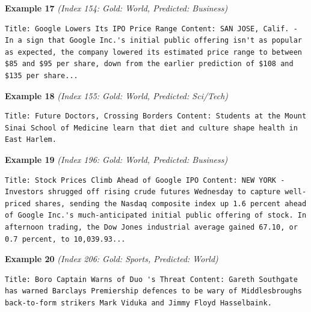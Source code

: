 \noindent
\textbf{Example 17} \quad \textit{(Index 154: Gold: World, Predicted: Business)}

\begin{Verbatim}[breaklines=true,breakanywhere=true,fontsize=\small]
Title: Google Lowers Its IPO Price Range Content: SAN JOSE, Calif. - In a sign that Google Inc.'s initial public offering isn't as popular as expected, the company lowered its estimated price range to between $85 and $95 per share, down from the earlier prediction of $108 and $135 per share...
\end{Verbatim}

\noindent
\textbf{Example 18} \quad \textit{(Index 155: Gold: World, Predicted: Sci/Tech)}

\begin{Verbatim}[breaklines=true,breakanywhere=true,fontsize=\small]
Title: Future Doctors, Crossing Borders Content: Students at the Mount Sinai School of Medicine learn that diet and culture shape health in East Harlem.
\end{Verbatim}

\noindent
\textbf{Example 19} \quad \textit{(Index 196: Gold: World, Predicted: Business)}

\begin{Verbatim}[breaklines=true,breakanywhere=true,fontsize=\small]
Title: Stock Prices Climb Ahead of Google IPO Content: NEW YORK - Investors shrugged off rising crude futures Wednesday to capture well-priced shares, sending the Nasdaq composite index up 1.6 percent ahead of Google Inc.'s much-anticipated initial public offering of stock. In afternoon trading, the Dow Jones industrial average gained 67.10, or 0.7 percent, to 10,039.93...
\end{Verbatim}

\noindent
\textbf{Example 20} \quad \textit{(Index 206: Gold: Sports, Predicted: World)}

\begin{Verbatim}[breaklines=true,breakanywhere=true,fontsize=\small]
Title: Boro Captain Warns of Duo 's Threat Content: Gareth Southgate has warned Barclays Premiership defences to be wary of Middlesbroughs back-to-form strikers Mark Viduka and Jimmy Floyd Hasselbaink.
\end{Verbatim}

